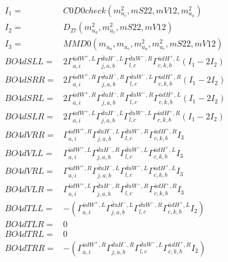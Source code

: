 \documentclass[A4,landscape]{article}
\begin{document}
\begin{align} 
I_1 = & C0D0check(m^2_{u_{{c}}}, mS22, mV12, m^2_{u_{{a}}}) \\ 
I_2 = & D_{27}(m^2_{u_{{a}}}, m^2_{u_{{c}}}, mS22, mV12) \\ 
I_3 = & MMD0(m_{u_{{a}}}, m_{u_{{c}}}, m^2_{u_{{a}}}, m^2_{u_{{c}}}, mS22, mV12) \\ 
  BO4dSLL= & 2  \Gamma^{\bar{u}d W^+,L}_{a, i} \Gamma^{\bar{d}u H^- ,L}_{j, a, b} \Gamma^{\bar{d}u W^- ,R}_{l, c} \Gamma^{\bar{u}d H^+,L}_{c, k, b} (I_1 - 2 I_2) \\ 
  BO4dSRR= & 2  \Gamma^{\bar{u}d W^+,R}_{a, i} \Gamma^{\bar{d}u H^- ,R}_{j, a, b} \Gamma^{\bar{d}u W^- ,L}_{l, c} \Gamma^{\bar{u}d H^+,R}_{c, k, b} (I_1 - 2 I_2) \\ 
  BO4dSRL= & 2  \Gamma^{\bar{u}d W^+,R}_{a, i} \Gamma^{\bar{d}u H^- ,R}_{j, a, b} \Gamma^{\bar{d}u W^- ,R}_{l, c} \Gamma^{\bar{u}d H^+,L}_{c, k, b} (I_1 - 2 I_2) \\ 
  BO4dSLR= & 2  \Gamma^{\bar{u}d W^+,L}_{a, i} \Gamma^{\bar{d}u H^- ,L}_{j, a, b} \Gamma^{\bar{d}u W^- ,L}_{l, c} \Gamma^{\bar{u}d H^+,R}_{c, k, b} (I_1 - 2 I_2) \\ 
  BO4dVRR= &  \Gamma^{\bar{u}d W^+,R}_{a, i} \Gamma^{\bar{d}u H^- ,L}_{j, a, b} \Gamma^{\bar{d}u W^- ,R}_{l, c} \Gamma^{\bar{u}d H^+,R}_{c, k, b} I_3 \\ 
  BO4dVLL= &  \Gamma^{\bar{u}d W^+,L}_{a, i} \Gamma^{\bar{d}u H^- ,R}_{j, a, b} \Gamma^{\bar{d}u W^- ,L}_{l, c} \Gamma^{\bar{u}d H^+,L}_{c, k, b} I_3 \\ 
  BO4dVRL= &  \Gamma^{\bar{u}d W^+,R}_{a, i} \Gamma^{\bar{d}u H^- ,L}_{j, a, b} \Gamma^{\bar{d}u W^- ,L}_{l, c} \Gamma^{\bar{u}d H^+,L}_{c, k, b} I_3 \\ 
  BO4dVLR= &  \Gamma^{\bar{u}d W^+,L}_{a, i} \Gamma^{\bar{d}u H^- ,R}_{j, a, b} \Gamma^{\bar{d}u W^- ,R}_{l, c} \Gamma^{\bar{u}d H^+,R}_{c, k, b} I_3 \\ 
  BO4dTLL= & -( \Gamma^{\bar{u}d W^+,L}_{a, i} \Gamma^{\bar{d}u H^- ,L}_{j, a, b} \Gamma^{\bar{d}u W^- ,R}_{l, c} \Gamma^{\bar{u}d H^+,L}_{c, k, b} I_2) \\ 
  BO4dTLR= & 0 \\ 
  BO4dTRL= & 0 \\ 
  BO4dTRR= & -( \Gamma^{\bar{u}d W^+,R}_{a, i} \Gamma^{\bar{d}u H^- ,R}_{j, a, b} \Gamma^{\bar{d}u W^- ,L}_{l, c} \Gamma^{\bar{u}d H^+,R}_{c, k, b} I_2) \\ 
\end{align} 
\end{document}

